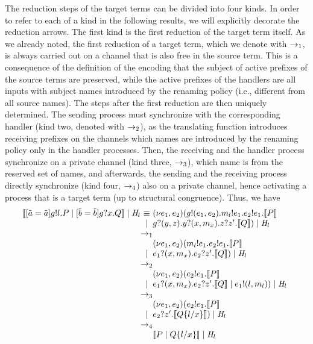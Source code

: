 The reduction steps of the target terms can be divided into four kinds. 
In order to refer to each of a kind in the following results, we will explicitly decorate the reduction arrows.
The first kind is the first reduction of the target term itself. 
As we already noted, the first reduction of a target term, which we denote with $\rightarrow_1$, is always carried out on a channel that is also free in the source term. This is a consequence of the definition of the encoding that the subject of active prefixes of the source terms are preserved, while the active prefixes of the handlers are all inputs with subject names introduced by the renaming policy (i.e., different from all source names). 
The steps after the first reduction are then uniquely determined. The sending process must synchronize with the corresponding handler (kind two, denoted with $\rightarrow_2$), as the translating function introduces receiving prefixes on the channels which names are introduced by the renaming policy only in the handler processes.  
Then, the receiving and the handler process synchronize on a private channel (kind three, $\rightarrow_3$), which name is from the reserved set of names, and afterwards, the sending and the receiving process directly synchronize (kind four, $\rightarrow_4$) also on a private channel, hence activating a process that is a target term (up to structural congruence).
Thus, we have
\[
\begin{array}{@{}l@{}c@{}l}
 \enc{\match{\tilde{\NA}}\role\msg{\tilde{\NA}}\send\NGG\role\msg\NL.\PP \parop \match{\tilde{\NB}}\role\msg{\tilde{\NB}}\receive\NGG\role\msg\NX.\PQ} \parop \handler_\NL
 & \equiv &  
 \rest{\NE_1,\NE_2}( \send{\NGG}\role\msg{(\NE_1,\NE_2)}.\send{\NM_\NL}\role\msg{\NE_1}.\send{\NE_2}\role\msg{\NE_1}.  \enc{ \PP }\\
 & \parop & \receive\NGG\role\msg{(\NY,\NZ)}.\receive\NY\role\msg{(\NX,\NM_\NX)}.\receive{\NZ}\role\msg{\NZ'}. \enc{\PQ} ) \parop  \handler_\NL\\
 &\red_1  & \\
 &  & \rest{\NE_1,\NE_2}( \send{\NM_\NL}\role\msg{\NE_1}.\send{\NE_2}\role\msg{\NE_1}.  \enc{ \PP }\\
 & \parop & \receive{\NE_1}\role\msg{(\NX,\NM_\NX)}.\receive{\NE_2}\role\msg{\NZ'}. \enc{\PQ}) \parop \handler_\NL\\
  &\red_2  & \\
 & & \rest{\NE_1,\NE_2}( \send{\NE_2}\role\msg{\NE_1}.  \enc{ \PP }\\
 & \parop & \receive{\NE_1}\role\msg{(\NX,\NM_\NX)}.\receive{\NE_2}\role\msg{\NZ'}. \enc{\PQ}  \parop  \send{\NE_1}\role\msg{(\NL,\NM_\NL)}) \parop \handler_\NL\\
  &\red_3  & \\
 & & \rest{\NE_1,\NE_2}( \send{\NE_2}\role\msg{\NE_1}.  \enc{ \PP }\\
 & \parop & \receive{\NE_2}\role\msg{\NZ'}. \enc{\PQ\subst{\NL}{\NX}} ) \parop \handler_\NL\\
   &\red_4  & \\
 & &   \enc{ \PP  \parop \PQ\subst{\NL}{\NX}}  \parop \handler_\NL\\
\end{array}
\]
